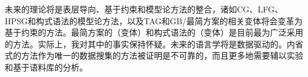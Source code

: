 未来的理论将是表层导向、基于约束和模型论方法的整合，诸如CG\indexcgc、LFG\indexlfgc、HPSG\indexhpsgc 和构式语法\indexcxgc 的模型论方法，以及TAG\indextagc 和GB/最简方案\indexgbc \indexmpc 的相关变体将会变革为基于约束的方法。最简方案的（变体）和构式语法的（变体）是目前最为广泛采用的方法。实际上，我对其中的事实保持怀疑。未来的语言学将是数据驱动的。内省式的方法作为唯一的数据搜集的方法被证明是不可靠的\citep{Mueller2007c,MM2009a}，而且更多地需要辅以实验和基于语料库的分析。

